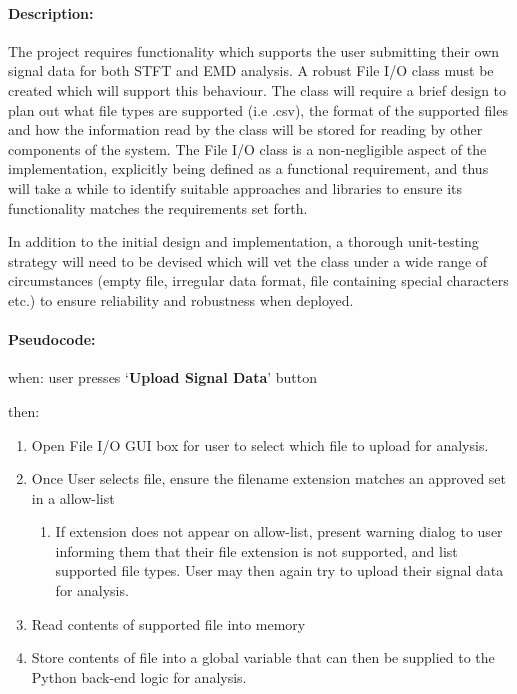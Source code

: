 \documentclass[
  english,
  paper=a4,
  oneside  ,captions=tableheading
]{scrbook}
\providecommand{\tightlist}{%
  \setlength{\itemsep}{0pt}\setlength{\parskip}{0pt}}
\begin{document}
\hypertarget{description-3}{%
\paragraph{Description:}\label{description-3}}

The project requires functionality which supports the user submitting
their own signal data for both STFT and EMD analysis. A robust File I/O
class must be created which will support this behaviour. The class will
require a brief design to plan out what file types are supported (i.e
.csv), the format of the supported files and how the information read by
the class will be stored for reading by other components of the system.
The File I/O class is a non-negligible aspect of the implementation,
explicitly being defined as a functional requirement, and thus will take
a while to identify suitable approaches and libraries to ensure its
functionality matches the requirements set forth.

In addition to the initial design and implementation, a thorough
unit-testing strategy will need to be devised which will vet the class
under a wide range of circumstances (empty file, irregular data format,
file containing special characters etc.) to ensure reliability and
robustness when deployed.

\hypertarget{t5-file-io-asdf}{%
\paragraph{Pseudocode:\\}\label{t5-file-io-asdf}}

when: user presses `\textbf{Upload Signal Data}' button

then:

\begin{enumerate}
\def\labelenumi{\arabic{enumi}.}
\tightlist
\item
  Open File I/O GUI box for user to select which file to upload for
  analysis.
\item
  Once User selects file, ensure the filename extension matches an
  approved set in a allow-list 
\begin{enumerate}
	\item If extension does not appear on allow-list, present warning dialog to user informing them that their file extension is not supported, and list supported file types. User may then again try to upload their signal data for analysis.
\end{enumerate}
\item
  Read contents of supported file into memory
\item
  Store contents of file into a global variable that can then be
  supplied to the Python back-end logic for analysis.
\end{enumerate}
\end{document}
